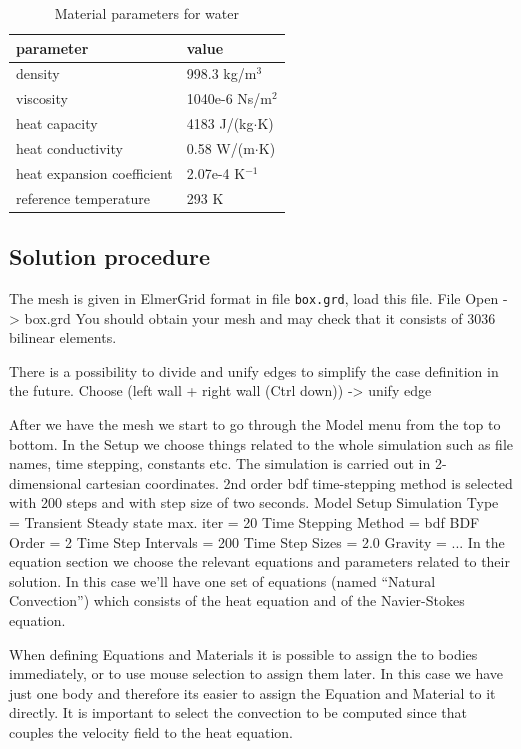 \begin{table}[h]
\caption{Material parameters for water}
\label{tb:matpar}
\begin{center}
\begin{tabular}{ll} \hline
parameter  & value \\ \hline
density & 998.3 kg/m$^{3}$ \\
viscosity & 1040e-6 Ns/m$^{2}$ \\
heat capacity & 4183 J/(kg$\cdot$K) \\
heat conductivity & 0.58 W/(m$\cdot$K)       \\
heat expansion coefficient & 2.07e-4 K$^{-1}$      \\ 
reference temperature & 293 K       \\ \hline
\end{tabular}
\end{center}
\end{table}


\subsection*{Solution procedure}

The mesh is given in ElmerGrid format in file \texttt{box.grd}, load this file.
\ttbegin
File 
  Open -> box.grd
\ttend
You should obtain your mesh and may check that it consists of 3036 bilinear elements.

There is a possibility to divide and unify edges to simplify the case definition in the future.
\ttbegin
Choose (left wall + right wall (Ctrl down)) -> unify edge
\ttend

After we have the mesh we start to go through the Model menu from the top to bottom. 
In the Setup we choose things related to the whole simulation such as file names, 
time stepping, constants etc.
The simulation is carried out in 2-dimensional cartesian
coordinates. 2nd order bdf time-stepping method is selected with 200 steps
and with step size of two seconds.
\ttbegin
Model
  Setup 
    Simulation Type = Transient
    Steady state max. iter = 20
    Time Stepping Method = bdf
    BDF Order = 2
    Time Step Intervals = 200
    Time Step Sizes = 2.0
    Gravity = ...
\ttend
In the equation section we choose the relevant equations and parameters related to their solution. 
In this case we'll have one set of equations (named ``Natural Convection'') which consists of the heat equation
and of the Navier-Stokes equation.

When defining Equations and Materials it is possible to assign the to bodies immediately, or to use mouse
selection to assign them later. In this case we have just one body and therefore its easier to assign 
the Equation and Material to it directly.
It is important to select the 
convection to be computed since that couples the velocity field to the heat equation.

